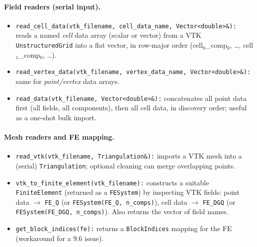 \documentclass[a4paper,12pt]{article}
\begin{document}
\paragraph{Field readers (serial input).}
\begin{itemize}
  \item \texttt{read\_cell\_data(vtk\_filename, cell\_data\_name, Vector<double>\&):}
        reads a named \emph{cell} data array (scalar or vector) from a VTK
        \texttt{UnstructuredGrid} into a flat vector, in row-major order
        (cell\(_0\)\_comp\(_0\), \dots, cell\(_1\)\_comp\(_0\), \dots).
  \item \texttt{read\_vertex\_data(vtk\_filename, vertex\_data\_name, Vector<double>\&):}
        same for \emph{point/vertex} data arrays.
  \item \texttt{read\_data(vtk\_filename, Vector<double>\&):}
        concatenates all point data first (all fields, all components), then
        all cell data, in discovery order; useful as a one-shot bulk import.
\end{itemize}

\paragraph{Mesh readers and FE mapping.}
\begin{itemize}
  \item \texttt{read\_vtk(vtk\_filename, Triangulation\&):}
        imports a VTK mesh into a (serial) \texttt{Triangulation}; optional
        cleaning can merge overlapping points.
  \item \texttt{vtk\_to\_finite\_element(vtk\_filename):}
        constructs a suitable \texttt{FiniteElement} (returned as a
        \texttt{FESystem}) by inspecting VTK fields:
        point data $\rightarrow$ \texttt{FE\_Q} (or \texttt{FESystem(FE\_Q, n\_comps)}),
        cell data $\rightarrow$ \texttt{FE\_DGQ} (or \texttt{FESystem(FE\_DGQ, n\_comps)}).
        Also returns the vector of field names.
  \item \texttt{get\_block\_indices(fe):}
        returns a \texttt{BlockIndices} mapping for the FE (workaround for a 9.6 issue).
\end{itemize}
\end{document}
